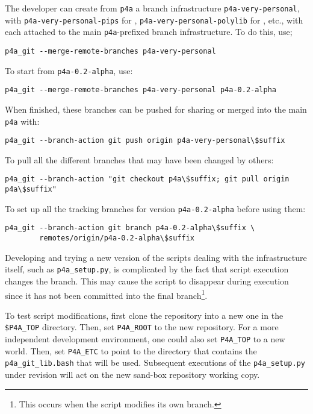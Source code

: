 \documentclass[a4paper]{article}
\begin{document}
The developer can create from \texttt{p4a} a branch infrastructure
\verb|p4a-very-personal|, with \verb|p4a-very-personal-pips| for
\Apips, \verb|p4a-very-personal-polylib| for \Apolylib, etc.,
with each attached to the main \verb|p4a|-prefixed branch
infrastructure. To do this, use;
\begin{verbatim}
p4a_git --merge-remote-branches p4a-very-personal
\end{verbatim}

To start from \texttt{p4a-0.2-alpha}, use:
\begin{verbatim}
p4a_git --merge-remote-branches p4a-very-personal p4a-0.2-alpha
\end{verbatim}

When finished, these branches can be pushed for sharing or merged
into the main \Apfa \texttt{p4a} with:
\begin{verbatim}
p4a_git --branch-action git push origin p4a-very-personal\$suffix
\end{verbatim}

To pull all the different \Apfa branches that may have been
changed by others:
\begin{verbatim}
p4a_git --branch-action "git checkout p4a\$suffix; git pull origin p4a\$suffix"
\end{verbatim}

To set up all the tracking branches for version
\texttt{p4a-0.2-alpha} before using them:
\begin{verbatim}
p4a_git --branch-action git branch p4a-0.2-alpha\$suffix \
        remotes/origin/p4a-0.2-alpha\$suffix
\end{verbatim}
\texttt{}
Developing and trying a new version of the scripts dealing with
the \Apfa infrastructure itself, such as \verb|p4a_setup.py|, is
complicated by the fact that script execution changes the branch. This may
cause the script to disappear during execution since it has not been
committed into the final branch\footnote{This occurs when the script
  modifies its own branch. \smiley}.

To test script modifications, first clone the repository into a new
one in the \verb|$P4A_TOP| %
directory. Then, set \verb|P4A_ROOT| to the new repository.
For a more independent development environment, one could also set
\verb|P4A_TOP| to a new world.
Then, set \verb|P4A_ETC| to point to the directory
that contains the \verb|p4a_git_lib.bash| that will be
used. Subsequent executions of the \verb|p4a_setup.py| under revision
will act on the new sand-box repository working copy.
\end{document}

